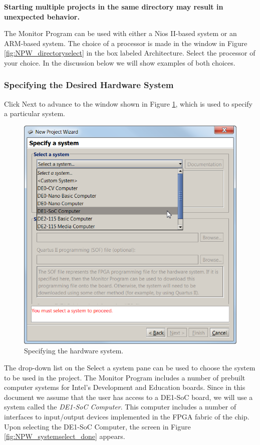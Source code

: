 \documentclass[11pt, twoside, pdftex]{article}
\begin{document}
{\bf Starting multiple projects in the same directory may result in unexpected behavior.}

The Monitor Program can be used with either a Nios II-based
system or an ARM-based system. The choice of a processor is made
in the window in Figure \ref{fig:NPW_directoryselect} in the box labeled Architecture.
Select the processor of your choice. 
In the discussion below we will show examples of both choices. 

\subsubsection{Specifying the Desired Hardware System}

Click {\sf Next} to advance to the window shown in Figure \ref{fig:NPW_systemselect},
which is used to specify a particular system.

\begin{figure}[H]
   \begin{center}
      \includegraphics[scale=1]{screenshots/figure6.png}
   \end{center}
   \caption{Specifying the hardware system.} 
   \label{fig:NPW_systemselect}
\end{figure}

The drop-down list on the {\sf Select a system} pane can be used
to choose the system to be used in the project. 
The Monitor Program includes a number of prebuilt computer
systems for Intel's Development and Education boards.
Since in this document we assume that the user has access to a
DE1-SoC board, we will use a system called the 
{\it DE1-SoC Computer}. 
This computer includes a number of interfaces to 
input/output devices implemented in the FPGA fabric of the chip.
Upon selecting the DE1-SoC Computer, the screen in Figure \ref{fig:NPW_systemselect_done}
appears.
\end{document}
